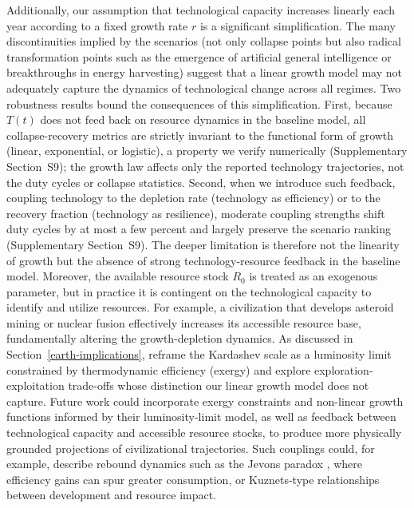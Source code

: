Additionally, our assumption that technological capacity increases linearly each year according to a fixed growth rate $r$ is a significant simplification. The many discontinuities implied by the scenarios (not only collapse points but also radical transformation points such as the emergence of artificial general intelligence or breakthroughs in energy harvesting) suggest that a linear growth model may not adequately capture the dynamics of technological change across all regimes. Two robustness results bound the consequences of this simplification. First, because $T(t)$ does not feed back on resource dynamics in the baseline model, all collapse-recovery metrics are strictly invariant to the functional form of growth (linear, exponential, or logistic), a property we verify numerically (Supplementary Section~S9); the growth law affects only the reported technology trajectories, not the duty cycles or collapse statistics. Second, when we introduce such feedback, coupling technology to the depletion rate (technology as efficiency) or to the recovery fraction (technology as resilience), moderate coupling strengths shift duty cycles by at most a few percent and largely preserve the scenario ranking (Supplementary Section~S9). The deeper limitation is therefore not the linearity of growth but the absence of strong technology-resource feedback in the baseline model. Moreover, the available resource stock $R_0$ is treated as an exogenous parameter, but in practice it is contingent on the technological capacity to identify and utilize resources. For example, a civilization that develops asteroid mining or nuclear fusion effectively increases its accessible resource base, fundamentally altering the growth-depletion dynamics. As discussed in Section~\ref{earth-implications}, \citet{Haqq-Misra2025-lum} reframe the Kardashev scale as a luminosity limit constrained by thermodynamic efficiency (exergy) and explore exploration-exploitation trade-offs whose distinction our linear growth model does not capture. Future work could incorporate exergy constraints and non-linear growth functions informed by their luminosity-limit model, as well as feedback between technological capacity and accessible resource stocks, to produce more physically grounded projections of civilizational trajectories. Such couplings could, for example, describe rebound dynamics such as the Jevons paradox \citep{Jevons1865-cq}, where efficiency gains can spur greater consumption, or Kuznets-type relationships between development and resource impact.
